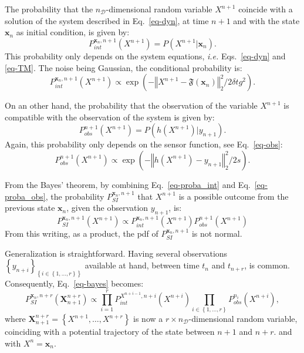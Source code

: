 \documentclass[aip,pof,nofootinbib,reprint,onecolumn]{revtex4-1}
\newcommand{\gras}[1]{\boldsymbol{#1}}
\newcommand{\mypar}[1]{\left(#1\right)}
\newcommand{\mya}[1]{\left\{#1\right\}}
\newcommand{\norme}[1]{\left\Vert #1\right\Vert_2}
\newcommand{\Nphaz}{n_{\mathcal{D}}} %
\newcommand{\fint}{\mathfrak{F}} %
\newcommand{\obs}{y} %
\newcommand{\point}{\gras{x}} %
\newcommand{\rpoint}{X}
\begin{document}
The probability that the $\Nphaz$-dimensional random variable $\rpoint^{n+1}$ coincide with a solution of the system described in Eq.~\eqref{eq-dyn}, at time $n+1$ and with the state $\point_{n}$ as initial condition, is given by:
$$P^{\point_n,n+1}_{int}\mypar{\rpoint^{n+1}} = P\mypar{\rpoint^{n+1}|\point_n}.$$ 
This probability only depends on the system equations, \emph{i.e.} Eqs.~\eqref{eq-dyn} and \eqref{eq-TM}. The noise being Gaussian, the conditional probability is:
\begin{equation}
P^{\point_n,n+1}_{int}\mypar{\rpoint^{n+1}} \propto \exp \mypar{- \norme{\rpoint^{n+1} - \fint\mypar{\point_n}}^2/2\delta t g^2}.
\label{eq-proba_int}
\end{equation}

On an other hand, the probability that the observation of the variable $\rpoint^{n+1}$ is compatible with the observation of the system is given by:
$$P^{n+1}_{obs}\mypar{\rpoint^{n+1}} = P\mypar{h\mypar{\rpoint^{n+1}}|\obs_{n+1}}.$$ 
Again, this probability only depends on the sensor function, see Eq.~\eqref{eq-obs}:
\begin{equation}
 P^{n+1}_{obs}\mypar{\rpoint^{n+1}}  \propto \exp \mypar{- \norme{h\mypar{\rpoint^{n+1}} - y_{n+1}}^2/2s}.
\label{eq-proba_obs}
\end{equation}

From the Bayes' theorem, by combining Eq.~\eqref{eq-proba_int} and Eq.~\eqref{eq-proba_obs}, the probability $P^{\point_n,n+1}_{SI}$ that $\rpoint^{n+1}$ is a possible outcome from the previous state $\point_n$, given the observation $\obs_{n+1}$, is:
\begin{equation}
P^{\point_n,n+1}_{SI}\mypar{\rpoint^{n+1}} \propto P^{\point_n,n+1}_{int}\mypar{\rpoint^{n+1}} P^{n+1}_{obs}\mypar{\rpoint^{n+1}}
\label{eq-bayes}
\end{equation}
From this writing, as a product, the pdf of $P^{\point_n,n+1}_{SI}$ is not normal.

Generalization is straightforward. 
Having several observations $\mya{\obs_{n+i}}_{\mya{i\in \mya{1,\hdots,r}}}$ available at hand, between time $t_n$ and $t_{n+r}$, is common. 
Consequently,  Eq.~\eqref{eq-bayes} becomes:
\begin{equation}
P^{\point_n,n+r}_{SI}\mypar{\gras{\rpoint}_{n+1}^{n+r}} \propto \prod_{i=1}^r P^{\rpoint^{n+i-1},n+i}_{int}\mypar{\rpoint^{n+i}} \prod_{i\in \mya{1,\hdots,r}} P^{n_i}_{obs}\mypar{\rpoint^{n+i}},
\label{eq-SI}
\end{equation}
where $\gras{\rpoint}_{n+1}^{n+r} = \mya{\rpoint^{n+1}, \hdots,\rpoint^{n+r}}$ is now a $r\times\Nphaz$-dimensional random variable, coinciding with a potential trajectory of the state between $n+1$ and ${n+r}$. and with $\rpoint^n = \point_n$.
\end{document}
